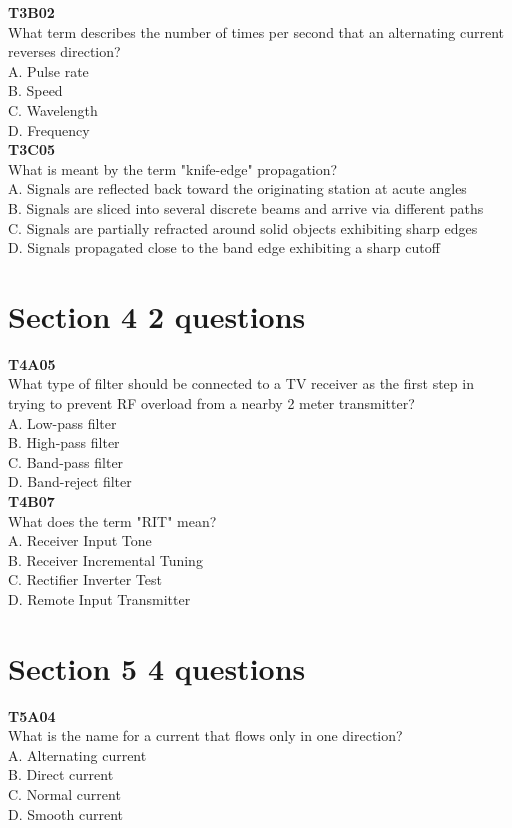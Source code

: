 \documentclass[12pt,letterpaper,twocolumn]{report}
\begin{document}
\textbf{T3B02}\\
What term describes the number of times per second that an alternating current reverses direction?\\
A. Pulse rate\\
B. Speed\\
C. Wavelength\\
D. Frequency\\

\textbf{T3C05}\\
What is meant by the term "knife-edge" propagation?\\
A. Signals are reflected back toward the originating station at acute angles\\
B. Signals are sliced into several discrete beams and arrive via different paths\\
C. Signals are partially refracted around solid objects exhibiting sharp edges\\
D. Signals propagated close to the band edge exhibiting a sharp cutoff\\

\section{Section 4 2 questions}

\textbf{T4A05}\\
What type of filter should be connected to a TV receiver as the first step in trying to prevent RF overload from a nearby 2 meter transmitter?\\
A. Low-pass filter\\
B. High-pass filter\\
C. Band-pass filter\\
D. Band-reject filter\\

\textbf{T4B07}\\
What does the term "RIT" mean?\\
A. Receiver Input Tone\\
B. Receiver Incremental Tuning\\
C. Rectifier Inverter Test\\
D. Remote Input Transmitter\\

\section{Section 5 4 questions}

\textbf{T5A04}\\
What is the name for a current that flows only in one direction?\\
A. Alternating current\\
B. Direct current\\
C. Normal current\\
D. Smooth current\\
\end{document}
